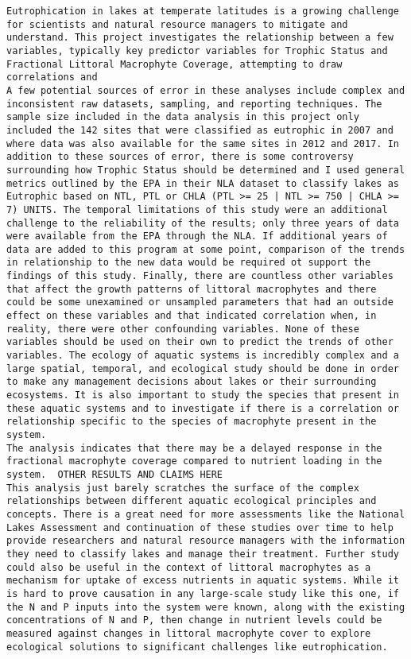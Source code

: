 \documentclass[
]{book}
\begin{document}
\begin{verbatim}
Eutrophication in lakes at temperate latitudes is a growing challenge for scientists and natural resource managers to mitigate and understand. This project investigates the relationship between a few variables, typically key predictor variables for Trophic Status and Fractional Littoral Macrophyte Coverage, attempting to draw correlations and 
A few potential sources of error in these analyses include complex and inconsistent raw datasets, sampling, and reporting techniques. The sample size included in the data analysis in this project only included the 142 sites that were classified as eutrophic in 2007 and where data was also available for the same sites in 2012 and 2017. In addition to these sources of error, there is some controversy surrounding how Trophic Status should be determined and I used general metrics outlined by the EPA in their NLA dataset to classify lakes as Eutrophic based on NTL, PTL or CHLA (PTL >= 25 | NTL >= 750 | CHLA >= 7) UNITS. The temporal limitations of this study were an additional challenge to the reliability of the results; only three years of data were available from the EPA through the NLA. If additional years of data are added to this program at some point, comparison of the trends in relationship to the new data would be required ot support the findings of this study. Finally, there are countless other variables that affect the growth patterns of littoral macrophytes and there could be some unexamined or unsampled parameters that had an outside effect on these variables and that indicated correlation when, in reality, there were other confounding variables. None of these variables should be used on their own to predict the trends of other variables. The ecology of aquatic systems is incredibly complex and a large spatial, temporal, and ecological study should be done in order to make any management decisions about lakes or their surrounding ecosystems. It is also important to study the species that present in these aquatic systems and to investigate if there is a correlation or relationship specific to the species of macrophyte present in the system. 
The analysis indicates that there may be a delayed response in the fractional macrophyte coverage compared to nutrient loading in the system.  OTHER RESULTS AND CLAIMS HERE
This analysis just barely scratches the surface of the complex relationships between different aquatic ecological principles and concepts. There is a great need for more assessments like the National Lakes Assessment and continuation of these studies over time to help provide researchers and natural resource managers with the information they need to classify lakes and manage their treatment. Further study could also be useful in the context of littoral macrophytes as a mechanism for uptake of excess nutrients in aquatic systems. While it is hard to prove causation in any large-scale study like this one, if the N and P inputs into the system were known, along with the existing concentrations of N and P, then change in nutrient levels could be measured against changes in littoral macrophyte cover to explore ecological solutions to significant challenges like eutrophication. 

\end{verbatim}
\end{document}
